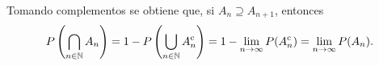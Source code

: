 \begin{corollary}
    Tomando complementos se obtiene que, si $A_n \supseteq A_{n+1}$, entonces
    \begin{equation*}
        P\left(\bigcap_{n \in \mathbb{N}} A_n\right)
        = 1 - P\left(\bigcup_{n \in \mathbb{N}} A_n^{\mathrm{c}}\right)
        = 1 - \lim_{n \to \infty} P(A_n^{\mathrm{c}})
        = \lim_{n \to \infty} P(A_n).
    \end{equation*}
\end{corollary}

